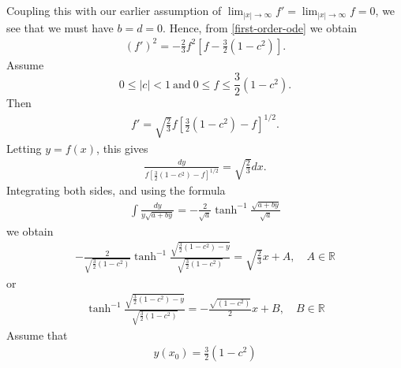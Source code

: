 \documentclass[12pt,reqno]{amsart}
\numberwithin{equation}{section}  %
\newcommand{\rr}{\mathbb{R}}
\begin{document}
%
%
Coupling this with our earlier assumption of $\lim_{| x | \to \infty} f' = \lim_{| x
| \to \infty} f = 0$, we see that we must have $b =d=0$. Hence, from 
\eqref{first-order-ode} we obtain 
%
%
\begin{equation}
  \label{bous-ode-simp}
\begin{split}
  (f')^{2} = -\frac{2}{3} f^{2} \left[ f - \frac{3}{2}(1-c^{2})  \right].
\end{split}
\end{equation}
%
%
Assume $$0 \le |c| < 1 \ \text{and} \ 0 \le f \le \frac{3}{2}(1-c^{2}).$$ 
%
%
Then
%
%
\begin{equation*}
\begin{split}
  f' = \sqrt{\frac{2}{3}}f \left[ \frac{3}{2}(1 - c^{2}) -f \right]^{1/2}.
\end{split}
\end{equation*}
%
%
Letting $y = f(x)$, this gives
%
%
\begin{equation*}
\begin{split}
\frac{dy}{ f \left[ \frac{3}{2}(1 - c^{2}) -f \right]^{1/2}} = \sqrt{\frac{2}{3}}
dx.
\end{split}
\end{equation*}
%
%
Integrating both sides, and using the formula
%
%
\begin{equation*}
\begin{split}
  \int \frac{dy}{y \sqrt{a + by}} = -\frac{2}{ \sqrt{a}} \tanh^{-1}
  \frac{\sqrt{a+ by}}{ \sqrt{a}}
\end{split}
\end{equation*}
%
%
we obtain
%
%
\begin{equation*}
\begin{split}
  -\frac{2}{\sqrt{\frac{3}{2}(1-c^{2})}} \tanh^{-1}
  \frac{\sqrt{\frac{3}{2}(1-c^{2}) - y}}{\sqrt{\frac{3}{2}(1-c^{2})}} =
  \sqrt{\frac{2}{3}}x + A, \quad A \in \rr
\end{split}
\end{equation*}
%
%
or
\begin{equation*}
\begin{split}
  \tanh^{-1}
  \frac{\sqrt{\frac{3}{2}(1-c^{2}) - y}}{\sqrt{\frac{3}{2}(1-c^{2})}} =
  - \frac{\sqrt{(1-c^{2})}}{2}x + B, \quad B \in \rr
\end{split}
\end{equation*}
%
Assume that
%
%
\begin{equation*}
\begin{split}
  y(x_{0}) = \frac{3}{2}(1-c^{2})
\end{split}
\end{equation*}
\end{document}
